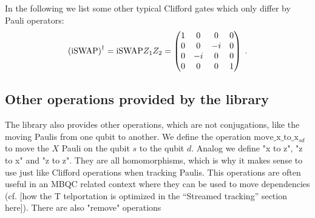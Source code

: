\documentclass[a4paper,english]{scrartcl}
\begin{document}
\begin{remark}
In the following we list some other typical Clifford gates which only differ by Pauli
operators:
\begin{align}
  \w(\iSwap)\ur = \iSwap Z_1Z_2 = \matp{1&0&0&0\\0&0&-i&0\\0&-i&0&0\\0&0&0&1}\;.
\end{align}
\end{remark}

\subsection{Other operations provided by the library}

The library also provides other operations, which are not conjugations, like the moving
Paulis from one qubit to another. We define the operation $\mathrm{move\_x\_to\_x}_{sd}$
to move the $X$ Pauli on the qubit $s$ to the qubit $d$. Analog we define "x to z", "z
to x" and "z to z". They are all homomorphisms, which is why it makes sense to use just
like Clifford operations when tracking Paulis. This operations are often useful in an
MBQC related context where they can be used to move dependencies (cf.
[how the T
telportation is optimized in the ``Streamed tracking'' section here]). There are also
"remove" operations
\end{document}
